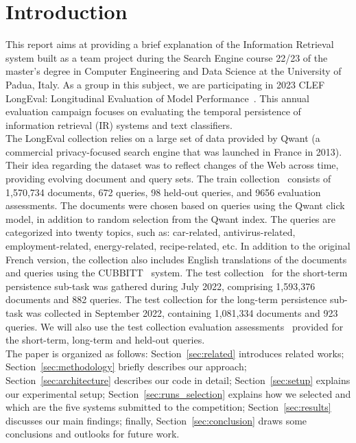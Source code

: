 \section{Introduction}
\label{sec:introduction}

This report aims at providing a brief explanation of the Information Retrieval system built as a team project during the
Search Engine course 22/23 of the master's degree in Computer Engineering and Data Science at the University of Padua,
Italy.
As a group in this subject, we are participating in 2023 CLEF LongEval: Longitudinal Evaluation of Model
Performance~\cite{LongEval}.
This annual evaluation campaign focuses on evaluating the temporal persistence of information retrieval (IR) systems and
text classifiers.\\

The LongEval collection relies on a large set of data provided by Qwant (a commercial privacy-focused
search engine that was launched in France in 2013).
Their idea regarding the dataset was to reflect changes of the Web across time, providing
evolving document and query sets.
The train collection~\cite{traindata} consists of 1,570,734 documents, 672 queries, 98 held-out queries, and 9656
evaluation assessments.
The documents were chosen based on queries using the Qwant click model, in addition to random selection from the Qwant
index.
The queries are categorized into twenty topics, such as: car-related, antivirus-related, employment-related,
energy-related, recipe-related, etc.
In addition to the original French version, the collection also includes English translations of the documents and
queries using the CUBBITT~\cite{CUBBITT} system.
The test collection~\cite{testdata} for the short-term persistence sub-task was gathered during July 2022, comprising
1,593,376 documents and 882 queries.
The test collection for the long-term persistence sub-task was collected in September 2022, containing 1,081,334
documents and 923 queries.
We will also use the test collection evaluation assessments~\cite{test_qrels} provided for the short-term, long-term and
held-out queries.\\

The paper is organized as follows: Section~\ref{sec:related} introduces related works;
Section~\ref{sec:methodology} briefly describes our approach;
Section~\ref{sec:architecture} describes our code in detail;
Section~\ref{sec:setup} explains our experimental setup;
Section~\ref{sec:runs_selection} explains how we selected and which are the five systems submitted to the competition;
Section~\ref{sec:results} discusses our main findings;
finally, Section~\ref{sec:conclusion} draws some conclusions and outlooks for future work.